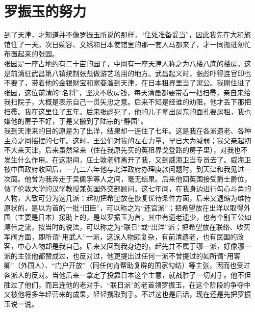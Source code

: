 \fancyhead[RO]{} %
\fancyhead[LE]{} %
\chapter*{罗振玉的努力}
\thispagestyle{empty}
到了天津，才知道并不像罗振玉所说的那样，“住处准备妥当”，因此我先在大和旅馆住了一天。次日婉容、文绣和日本使馆里的那一套人马都来了，才一同搬进匆忙布置起来的张园。\\

张园是一座占地约有二十亩的园子，中间有一座天津人称之为八楼八底的楼房。这是前清驻武昌第八镇统制张彪做游艺场用的地方。武昌起义时，张彪吓得连官印也不要了，带着他的金银财宝和家眷溜到天津，在日本租界里当了寓公。我刚住进了张园，这位前清的“名将”，坚决不收房钱，每天清晨都要带着一把扫帚，亲自来给我扫院子，大概是表示自己一贯矢忠之意。后来不知是经谁的劝阻，他才丢下那把扫帚。我在这里住了五年。后来张彪死了，他的儿子拿出房东的面孔要房租，我也嫌他的房子不好，于是又搬到了陆宗的“静园”。\\

我到天津来的目的原是为了出洋，结果却一连住了七年。这是我在各派遗老、各种主意之间摇摆的七年。这时，王公们对我的左右力量，早已大为减弱；我父亲起初不大来天津，后来虽然常来（住在我原先买的英租界戈登路的房子里），对我也不发生什么作用。在这期间，庄士敦老师离开了我，又到威海卫当专员去了。威海卫被中国政府收回后，一九二六年他与北洋政府办理庚款问题时，到天津和我见过一次面。他曾为我奔走于吴佩孚等人之间，毫无结果。后来他回英国接受爵士爵位，做了伦敦大学的汉学教授兼英国外交部顾问。这七年间，在我身边进行勾心斗角的人物，大致可分为这几派：起初把希望放在恢复优待条件方面，后来又退缩为维持原状的，是以为首的一批“旧臣”，可以称之为“还宫派”；把希望放在出洋以取得外国（主要是日本）援助上的，是以罗振玉为首，其中有遗老遗少，也有个别王公如溥伟之流，按当时的说法，可以称之为“联日”或“出洋”派；把希望放在联络、收买军阀方面，即所谓“用武人”一派，这派人物颇复杂，有前清遗老，也有民国的政客，中心人物却是我自己。后来又回到我身边的，起先并不属于哪一派，好像哪一派的主张他都赞成过，也反对过，他更提出过任何一派不曾提过的如所谓“用客卿”（外国人）、“门户开放”（同任何肯帮助复辟的国家勾结）等主张，因而也受过各派人的反对。当他后来一拿定了投靠日本这个主意，就战胜了一切对手。他不但胜过了他们，而且连他的老对手、“联日派”的老首领罗振玉，在这个阶段的争夺中又被他将多年经营来的成果，轻轻攫取到手。不过这也是后话，现在还是先把罗振玉说一说。\\

